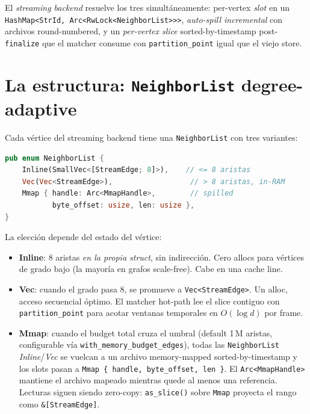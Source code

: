 El \emph{streaming backend} resuelve los tres simultáneamente:
per-vertex \emph{slot} en un \texttt{HashMap<StrId, Arc<RwLock<NeighborList>>>},
\emph{auto-spill incremental} con archivos round-numbered, y un
\emph{per-vertex slice} sorted-by-timestamp post-\texttt{finalize}
que el matcher consume con \texttt{partition\_point} igual que el
viejo store.

\section{La estructura: \texttt{NeighborList} degree-adaptive}

Cada vértice del streaming backend tiene una \texttt{NeighborList}
con tres variantes:

\begin{lstlisting}[language=Rust]
pub enum NeighborList {
    Inline(SmallVec<[StreamEdge; 8]>),    // <= 8 aristas
    Vec(Vec<StreamEdge>),                  // > 8 aristas, in-RAM
    Mmap { handle: Arc<MmapHandle>,        // spilled
           byte_offset: usize, len: usize },
}
\end{lstlisting}

\noindent
La elección depende del estado del vértice:

\begin{itemize}
    \item \textbf{Inline}: 8 aristas \emph{en la propia struct}, sin
    indirección. Cero allocs para vértices de grado bajo (la mayoría
    en grafos scale-free). Cabe en una cache line.
    \item \textbf{Vec}: cuando el grado pasa 8, se promueve a
    \texttt{Vec<StreamEdge>}. Un alloc, acceso secuencial óptimo.
    El matcher hot-path lee el slice contiguo con
    \texttt{partition\_point} para acotar ventanas temporales en
    \(O(\log d)\) por frame.
    \item \textbf{Mmap}: cuando el budget total cruza el umbral
    (default 1\,M aristas, configurable vía
    \texttt{with\_memory\_budget\_edges}), todas las
    \texttt{NeighborList} \emph{Inline}/\emph{Vec} se vuelcan a un
    archivo memory-mapped sorted-by-timestamp y los slots pasan a
    \texttt{Mmap \{ handle, byte\_offset, len \}}. El \texttt{Arc<MmapHandle>}
    mantiene el archivo mapeado mientras quede al menos una
    referencia. Lecturas siguen siendo zero-copy: \texttt{as\_slice()}
    sobre \texttt{Mmap} proyecta el rango como \texttt{\&[StreamEdge]}.
\end{itemize}

